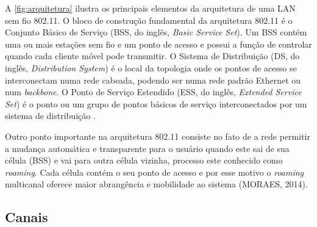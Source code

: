 A \autoref{fig:arquitetura} ilustra os principais elementos da arquitetura de uma LAN sem fio 802.11. O bloco de construção fundamental da arquitetura 802.11 é o Conjunto Básico de Serviço (BSS, do inglês, \textit{Basic Service Set}). Um BSS contém uma ou mais estações sem fio e um ponto de acesso e possui a função de controlar quando cada cliente móvel pode transmitir. O Sistema de Distribuição (DS, do inglês, \textit{Distribution System}) é o local da topologia onde os pontos de acesso se interconectam numa rede cabeada, podendo ser numa rede padrão Ethernet ou num \textit{backbone}. O Ponto de Serviço Estendido (ESS, do inglês, \textit{Extended Service Set}) é o ponto ou um grupo de pontos básicos de serviço interconectados por um sistema de distribuição \cite{moraes2010}.

\begin{figure}[H]
	\centering
\end{figure}

Outro ponto importante na arquitetura 802.11 consiste no fato de a rede permitir a mudança automática e transparente para o usuário quando este sai de sua célula (BSS) e vai para outra célula vizinha, processo este conhecido como \textit{roaming}. Cada célula contém o seu ponto de acesso e por esse motivo o \textit{roaming} multicanal oferece maior abrangência e mobilidade ao sistema (MORAES, 2014).

\subsection{Canais}
\label{subsec:canais}

